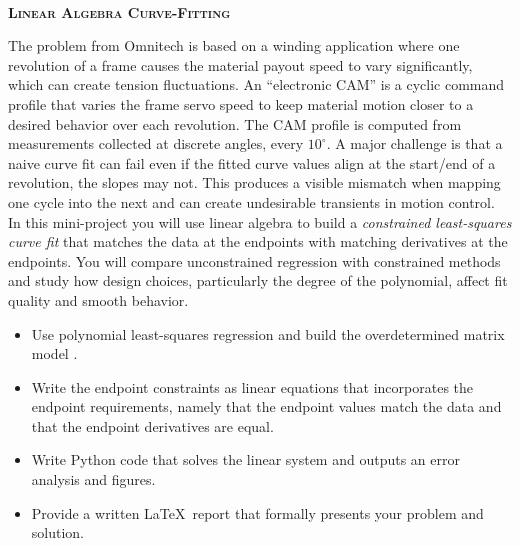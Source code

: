 \documentclass[article, 11pt]{article}
\begin{document}
\begin{center}
\\
\Huge{\textbf{\textsc{Linear Algebra Curve-Fitting}}}\\
\end{center}

\vspace{.6cm}

\noindent {}

\vspace{-.35cm}
\noindent \hrulefill

The problem from Omnitech is based on a winding application where one revolution of a frame causes the material payout speed to vary significantly, which can create tension fluctuations. An ``electronic CAM'' is a cyclic command profile that varies the frame servo speed to keep material motion closer to a desired behavior over each revolution. The CAM profile is computed from measurements collected at discrete angles, every $10^\circ$. A major challenge is that a naive curve fit can fail even if the fitted curve values align at the start/end of a revolution, the slopes may not. This produces a visible mismatch when mapping one cycle into the next and can create undesirable transients in motion control. In this mini-project you will use linear algebra to build a \textit{constrained least-squares curve fit} that matches the data at the endpoints with matching derivatives at the endpoints. You will compare unconstrained regression with constrained methods and study how design choices, particularly the degree of the polynomial, affect fit quality and smooth behavior.\\

\noindent {}

\vspace{-.35cm}
\noindent \hrulefill

\begin{itemize}
\item Use polynomial least-squares regression and build the overdetermined matrix model 	.

\item Write the endpoint constraints as linear equations that incorporates the endpoint requirements, namely that the endpoint values match the data and that the endpoint derivatives are equal. 
	\item Write Python code that solves the linear system and outputs an error analysis and figures. 
	\item Provide a written \LaTeX\, report that formally presents your problem and solution.
\end{itemize}
\end{document}

